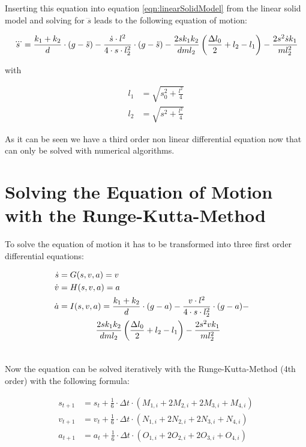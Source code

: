 Inserting this equation into equation \ref{eqn:linearSolidModel} from the linear solid model and solving for $\dddot s$ leads to the following equation of motion:

\begin{equation}
\begin{split}
	\dddot s = \frac{k_1 + k_2}{d} \cdot (g - \ddot s) - 
	\frac{\dot s\cdot l^2}{4\cdot s \cdot l_2^2}\cdot (g - \ddot s) - 
	\frac{2sk_1k_2}{dml_2} \left(\frac{\Delta l_0}{2} + l_2 - l_1\right) - \frac{2s^2\dot s k_1}{ml_2^2}	
\end{split}
\label{eqn:equationOfEmotion}
\end{equation}

with

\begin{align}
	l_1 &= \sqrt{s_0^2 + \frac{l^2}{4}} \\
	l_2 &= \sqrt{s^2 + \frac{l^2}{4}}
\end{align}

As it can be seen we have a third order non linear differential equation now that can only be solved with numerical algorithms.

\section{Solving the Equation of Motion with the Runge-Kutta-Method }

To solve the equation of motion it has to be transformed into three first order differential equations:

\begin{align}
	\dot s &=G(s,v,a) = v \\
	\dot v &= H(s,v,a) = a \\
	\dot a &\begin{multlined}[t] = I(s,v,a) =\insertForSmartphone{\\} \frac{k_1 + k_2}{d} \cdot (g - a) - \frac{v\cdot l^2}{4\cdot s \cdot l_2^2} \cdot (g - a) - \\ \frac{2sk_1k_2}{dml_2} \left(\frac{\Delta l_0}{2} + l_2 - l_1\right) - \frac{2s^2v k_1}{ml_2^2} \\
	\end{multlined}
\end{align}

Now the equation can be solved iteratively with the Runge-Kutta-Method (4th order) with the following formula:

\begin{align}
	s_{t+1} &= s_t + \frac{1}{6} \cdot \Delta t \cdot (M_{1,i} + 2 M_{2,i} +2M_{3,i} +M_{4,i} ) \\ v_{t+1} &= v_t + \frac{1}{6} \cdot \Delta t \cdot (N_{1,i} + 2 N_{2,i} +2N_{3,i} +N_{4,i} ) \\
	a_{t+1} &= a_t + \frac{1}{6} \cdot \Delta t \cdot (O_{1,i} + 2 O_{2,i} +2O_{3,i} +O_{4,i} ) 
\end{align}


